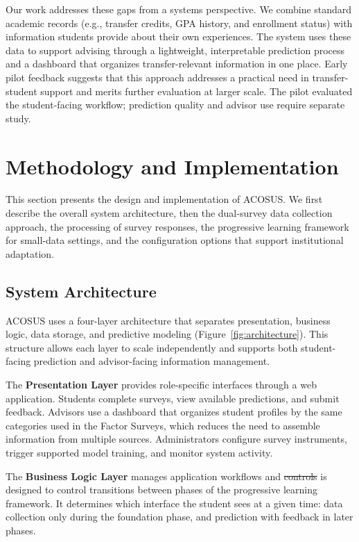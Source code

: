 \documentclass[letterpaper,11pt]{article}
\newcommand{\DIFdel}[1]{%
  \begingroup\setlength{\fboxsep}{0.5pt}%
  \colorbox{diffdelbg}{\textcolor{diffdeltext}{\sout{#1}}}%
  \endgroup}
\newcommand{\DIFadd}[1]{%
  \begingroup\setlength{\fboxsep}{0.5pt}%
  \colorbox{diffaddbg}{\textcolor{diffaddtext}{#1}}%
  \endgroup}
\begin{document}
Our work addresses these gaps from a systems perspective. We combine standard academic records (e.g., transfer credits, GPA history, and enrollment status) with information students provide about their own experiences. The system uses these data to support advising through a lightweight, interpretable prediction process and a dashboard that organizes transfer-relevant information in one place. Early pilot feedback suggests that this approach addresses a practical need in transfer-student support and merits further evaluation at larger scale. \DIFadd{The} \DIFadd{pilot} \DIFadd{evaluated} \DIFadd{the} \DIFadd{student-facing} \DIFadd{workflow;} \DIFadd{prediction} \DIFadd{quality} \DIFadd{and} \DIFadd{advisor} \DIFadd{use} \DIFadd{require} \DIFadd{separate} \DIFadd{study.}

\section{Methodology and Implementation}\label{sec:methodology}

This section presents the design and implementation of ACOSUS. We first describe the overall system architecture, then the dual-survey data collection approach, the processing of survey responses, the progressive learning framework for small-data settings, and the configuration options that support institutional adaptation.

\subsection{System Architecture}\label{subsec:sysarch}

ACOSUS uses a four-layer architecture that separates presentation, business logic, data storage, and predictive modeling (Figure~\ref{fig:architecture}). This structure allows each layer to scale independently and supports both student-facing prediction and advisor-facing information management.

The \textbf{Presentation Layer} provides role-specific interfaces through a web application. Students complete surveys, view \DIFadd{available} predictions, and submit feedback. Advisors use a dashboard that organizes student profiles by the same categories used in the Factor Surveys, which reduces the need to assemble information from multiple sources. Administrators configure survey instruments, trigger \DIFadd{supported} model training, and monitor system activity.

The \textbf{Business Logic Layer} manages application workflows and \DIFdel{controls} \DIFadd{is} \DIFadd{designed} \DIFadd{to} \DIFadd{control} transitions between phases of the progressive learning framework. It determines which interface the student sees at a given time: data collection only during the foundation phase, and prediction with feedback in later phases.
\end{document}
